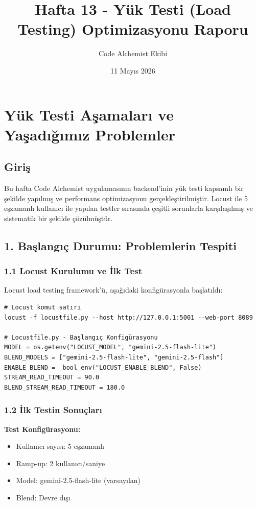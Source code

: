 \documentclass[12pt,a4paper]{report}
\title{Hafta 13 - Yük Testi (Load Testing) Optimizasyonu Raporu}
\author{Code Alchemist Ekibi}
\date{11 Mayıs 2026}
\begin{document}
\maketitle

\tableofcontents
\newpage

\chapter{Yük Testi Aşamaları ve Yaşadığımız Problemler}

\section{Giriş}

Bu hafta Code Alchemist uygulamasının backend'inin yük testi kapsamlı bir şekilde yapılmış ve performans optimizasyonu gerçekleştirilmiştir. Locust ile 5 eşzamanlı kullanıcı ile yapılan testler sırasında çeşitli sorunlarla karşılaşılmış ve sistematik bir şekilde çözülmüştür.

\section{1. Başlangıç Durumu: Problemlerin Tespiti}

\subsection{1.1 Locust Kurulumu ve İlk Test}

Locust load testing framework'ü, aşağıdaki konfigürasyonla başlatıldı:

\begin{lstlisting}
# Locust komut satırı
locust -f locustfile.py --host http://127.0.0.1:5001 --web-port 8089

# Locustfile.py - Başlangıç Konfigürasyonu
MODEL = os.getenv("LOCUST_MODEL", "gemini-2.5-flash-lite")
BLEND_MODELS = ["gemini-2.5-flash-lite", "gemini-2.5-flash"]
ENABLE_BLEND = _bool_env("LOCUST_ENABLE_BLEND", False)
STREAM_READ_TIMEOUT = 90.0
BLEND_STREAM_READ_TIMEOUT = 180.0
\end{lstlisting}

\subsection{1.2 İlk Testin Sonuçları}

\textbf{Test Konfigürasyonu:}
\begin{itemize}
    \item Kullanıcı sayısı: 5 eşzamanlı
    \item Ramp-up: 2 kullanıcı/saniye
    \item Model: gemini-2.5-flash-lite (varsayılan)
    \item Blend: Devre dışı
\end{itemize}
\end{document}
